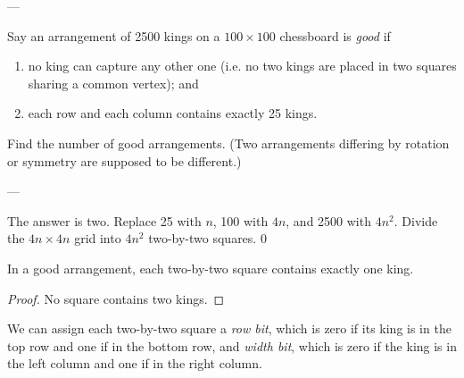 
---

Say an arrangement of 2500 kings on a $100\times100$ chessboard is \emph{good} if
\begin{enumerate}[label=(\roman*),itemsep=0em]
    \item no king can capture any other one (i.e. no two kings are placed in two squares sharing a common vertex); and
    \item each row and each column contains exactly 25 kings.
\end{enumerate}
Find the number of good arrangements. (Two arrangements differing by rotation or symmetry are supposed to be different.)

---

The answer is two. Replace 25 with $n$, 100 with $4n$, and 2500 with $4n^2$. Divide the $4n\times4n$ grid into $4n^2$ two-by-two squares.
\setcounter{claim}0
\begin{claim}
    In a good arrangement, each two-by-two square contains exactly one king.
\end{claim}
\begin{proof}
    No square contains two kings.
\end{proof}

We can assign each two-by-two square a \emph{row bit}, which is zero if its king is in the top row and one if in the bottom row, and \emph{width bit}, which is zero if the king is in the left column and one if in the right column.

